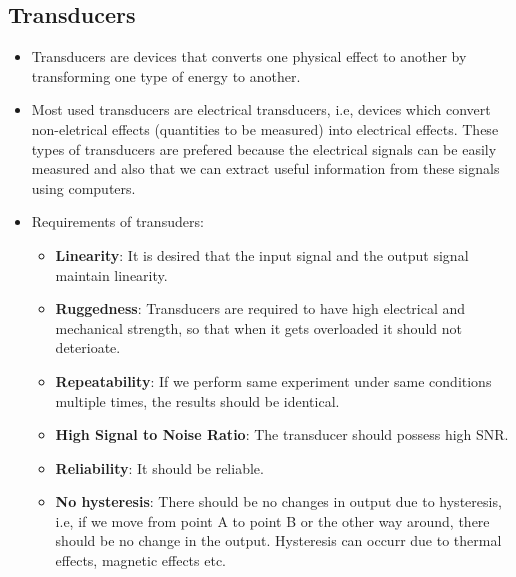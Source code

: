 \documentclass{article}
\begin{document}
	\subsection{Transducers}
		\begin{itemize}
			\item Transducers are devices that converts one physical effect to another by transforming one type of energy to another.
			\item Most used transducers are electrical transducers, i.e, devices which convert non-eletrical effects (quantities to be measured) into electrical effects. These types of transducers are prefered because the electrical signals can be easily measured and also that we can extract useful information from these signals using computers.

			\item Requirements of transuders:
			\begin{itemize}
				\item \textbf{Linearity}: It is desired that the input signal and the output signal maintain linearity.
				\item \textbf{Ruggedness}: Transducers are required to have high electrical and mechanical strength, so that when it gets overloaded it should not deterioate.
				\item \textbf{Repeatability}: If we perform same experiment under same conditions multiple times, the results should be identical.
				\item \textbf{High Signal to Noise Ratio}: The transducer should possess high SNR.
				\item \textbf{Reliability}: It should be reliable.
				\item \textbf{No hysteresis}: There should be no changes in output due to hysteresis, i.e, if we move from point A to point B or the other way around, there should be no change in the output. Hysteresis can occurr due to thermal effects, magnetic effects etc.
			\end{itemize} 


\end{itemize}
\end{document}
